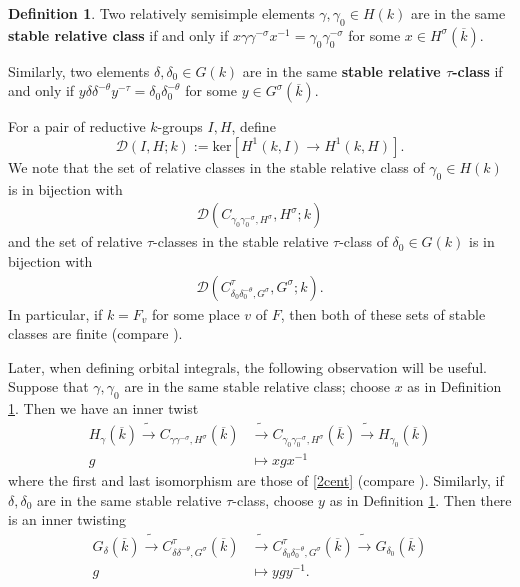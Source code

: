 \documentclass[12pt]{amsart}
\theoremstyle{remark}
\numberwithin{equation}{section}
\newcommand{\lto}{\longrightarrow}
\theoremstyle{definition}
\newtheorem{defn}[thm]{Definition}
\renewcommand{\bar}{\overline}
\numberwithin{equation}{subsection}
\begin{document}
\begin{defn} \label{defn-src}   Two relatively semisimple elements
$\gamma,\gamma_0 \in H(k)$
are in the same \textbf{stable relative class} if and only if
$x\gamma\gamma^{-\sigma}x^{-1}=\gamma_0\gamma_0^{-\sigma}$ for some $x \in H^{\sigma}(\bar{k})$.

Similarly, two elements $\delta, \delta_0 \in G(k)$ are in the same
\textbf{stable relative $\tau$-class} if and only if $y \delta\delta^{-\theta} y^{-\tau}=\delta_0\delta_0^{-\theta}$ for some $y \in G^{\sigma}(\bar{k})$.
\end{defn}

For a pair of reductive $k$-groups $I,H$,
define
$$
\mathcal{D}(I,H;k):=\mathrm{ker}\left[H^1(k,I) \to H^1(k,H)\right].
$$
We note that the set of relative classes in the stable relative class of $\gamma_0 \in H(k)$ is in bijection with
\begin{align}
 \mathcal{D}(C_{\gamma_0\gamma_0^{-\sigma},H^{\sigma}},H^{\sigma};k)
\end{align}
and the set of relative $\tau$-classes in the stable relative $\tau$-class of $\delta_0 \in G(k)$ is in bijection with
\begin{align} \label{stableclassbij}
\mathcal{D}(C^{\tau}_{\delta_0\delta_0^{-\theta},G^{\sigma}},G^{\sigma};k).
\end{align}
In particular, if $k=F_v$ for some place $v$ of $F$, then both of these sets of stable classes are finite
(compare \cite[\S 1.8, \S 2.3]{Lab}).

Later, when defining orbital integrals, the following observation will be useful.  Suppose that $\gamma,\gamma_0$ are in the same stable relative class; choose $x$ as in Definition \ref{defn-src}.  Then we have an inner twist
\begin{align}
\label{src-twist} H_{\gamma}(\bar{k}) \tilde{\lto} C_{\gamma\gamma^{-\sigma},H^{\sigma}}(\bar{k}) &\tilde{\lto}C_{\gamma_0\gamma_0^{-\sigma},H^{\sigma}}(\bar{k}) \tilde{\lto} H_{\gamma_0}(\bar{k})\\
\nonumber g & \longmapsto xgx^{-1}
\end{align}
where the first and last isomorphism are those of \eqref{2cent} (compare \cite[Lemma 3.2]{KottRatConj}).  Similarly, if $\delta,\delta_0$ are in the same stable relative $\tau$-class, choose $y$ as in Definition \ref{defn-src}.  Then there is an inner twisting
\begin{align}
\label{strc-twist}
G_{\delta}(\bar{k}) \tilde{\lto} C_{\delta \delta^{-\theta},G^{\sigma}}^{\tau}(\bar{k}) & \tilde{\lto} C_{\delta_0 \delta_0^{-\theta},G^{\sigma}}^{\tau}(\bar{k}) \tilde{\lto} G_{\delta_0}(\bar{k})\\
\nonumber g &\longmapsto ygy^{-1}.
\end{align}
\end{document}
